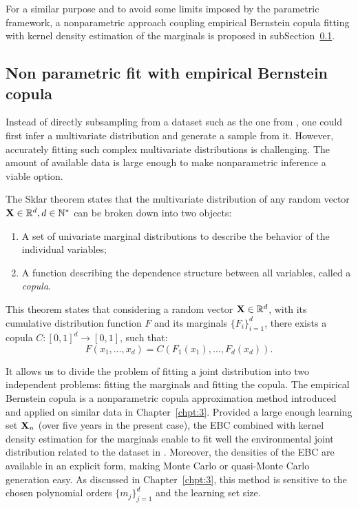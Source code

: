 For a similar purpose and to avoid some limits imposed by the parametric framework, 
a nonparametric approach coupling empirical Bernstein copula fitting with kernel density estimation of the marginals is proposed in subSection~\ref{sec:4ebc}.


\subsection{Non parametric fit with empirical Bernstein copula}\label{sec:4ebc}
Instead of directly subsampling from a dataset such as the one from , one could first infer a multivariate distribution and generate a sample from it. 
However, accurately fitting such complex multivariate distributions is challenging. 
The amount of available data is large enough to make nonparametric inference a viable option.

The Sklar theorem \citep{durante_2015_copula} states that the multivariate distribution of any random vector $\mathbf{X} \in \mathbb{R}^d, d \in \mathbb{N}^*$ can be broken down into two objects:
\begin{enumerate}
    \item A set of univariate marginal distributions to describe the behavior of the individual variables;
    \item A function describing the dependence structure between all variables, called a \textit{copula}.
\end{enumerate}
This theorem states that considering a random vector $\mathbf{X} \in \mathbb{R}^d$, with its cumulative distribution function $F$ and its marginals $\{F_i\}_{i=1}^d$, there exists a copula $C: [0, 1]^d \rightarrow [0, 1]$, such that:
\begin{equation}
    F(x_1, \dots, x_d) = C\left(F_1(x_1), \dots, F_d(x_d)\right). 
\end{equation}

It allows us to divide the problem of fitting a joint distribution into two independent problems: fitting the marginals and fitting the copula. 
The empirical Bernstein copula is a nonparametric copula approximation method introduced and applied on similar data in Chapter~\ref{chpt:3}. 
Provided a large enough learning set ${\bf X}_n$ (over five years in the present case), the EBC combined with kernel density estimation for the marginals enable to fit well the environmental joint distribution related to the dataset in . 
Moreover, the densities of the EBC are available in an explicit form, making Monte Carlo or quasi-Monte Carlo generation easy. 
As discussed in Chapter~\ref{chpt:3}, this method is sensitive to the chosen polynomial orders $\{m_j\}_{j=1}^d$ and the learning set size. 


